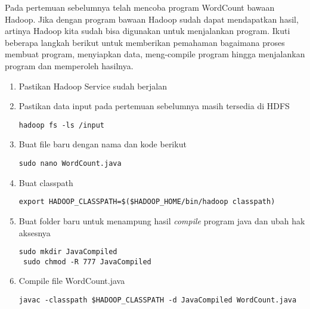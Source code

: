 \documentclass[a4paper]{tufte-handout}
\begin{document}
\hrulefill

\clearpage
{}

Pada pertemuan sebelumnya telah mencoba program WordCount bawaan Hadoop. Jika dengan program bawaan Hadoop sudah dapat mendapatkan hasil, artinya Hadoop kita sudah bisa digunakan untuk menjalankan program. Ikuti beberapa langkah berikut untuk memberikan pemahaman bagaimana proses membuat program, menyiapkan data, meng-compile program hingga menjalankan program dan memperoleh hasilnya.

\begin{enumerate}
\item Pastikan Hadoop Service sudah berjalan
\item Pastikan data input pada pertemuan sebelumnya masih tersedia di HDFS
\begin{lstlisting}[language=Terminal]
 hadoop fs -ls /input
\end{lstlisting}

\item Buat file baru dengan nama dan kode berikut
\begin{lstlisting}[language=Terminal]
 sudo nano WordCount.java
\end{lstlisting} 


\item Buat classpath
\begin{lstlisting}[language=Terminal]
 export HADOOP_CLASSPATH=$($HADOOP_HOME/bin/hadoop classpath)
\end{lstlisting} 

\item Buat folder baru untuk menampung hasil \textit{compile} program java dan ubah hak aksesnya
\begin{lstlisting}[language=Terminal]
 sudo mkdir JavaCompiled
 sudo chmod -R 777 JavaCompiled
\end{lstlisting}

\item Compile file WordCount.java
\begin{lstlisting}[language=Terminal]
 javac -classpath $HADOOP_CLASSPATH -d JavaCompiled WordCount.java
\end{lstlisting}


\end{enumerate}
\end{document}
